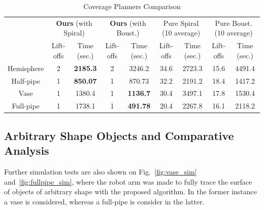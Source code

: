 \documentclass[journal]{IEEEtran}
\begin{document}
\begin{table}[t]
\centering
\caption{Coverage Planners Comparison}
\renewcommand{\arraystretch}{1.2}
\begin{tabular}{|c|c|c|c|c|c|c|c|c|}
\hline
& \multicolumn{2}{c|}{\textbf{Ours} (with Spiral)} & \multicolumn{2}{c|}{\textbf{Ours} (with Boust.)} & \multicolumn{2}{c|}{Pure Spiral (10 average)} & \multicolumn{2}{c|}{Pure Boust. (10 average)}\\
\cline{2-9}
& Lift-offs & Time (sec.) & Lift-offs & Time (sec.) & Lift-offs & Time (sec.) & Lift-offs & Time (sec.)\\
\hline
\hline
Hemisphere &2&\textbf{2185.3}& 2 &3246.2 &34.6 &2723.3 &15.6 &4491.4\\
\hline
Half-pipe &1&\textbf{850.07}& 1 &870.73&32.2&2191.2&18.4&1417.2\\
\hline
Vase &1&1380.4& 1&\textbf{1136.7}&30.4&3497.1&17.8&1530.4\\
\hline
Full-pipe&1&1738.1&1&\textbf{491.78}&20.4&2267.8&16.1&2118.2\\
\hline
\end{tabular}
\label{table:comparative_results}
\end{table}


\subsection{Arbitrary Shape Objects and Comparative Analysis}
\label{sec:other_sim_examples}
Further simulation tests are also shown on Fig.~\ref{fig:vase_sim} and~\ref{fig:fullpipe_sim}, where the robot arm was 
made to fully trace the surface of objects of arbitrary shape with the proposed algorithm. 
In the former instance a vase is considered, whereas a full-pipe is consider in the latter. 
\end{document}
